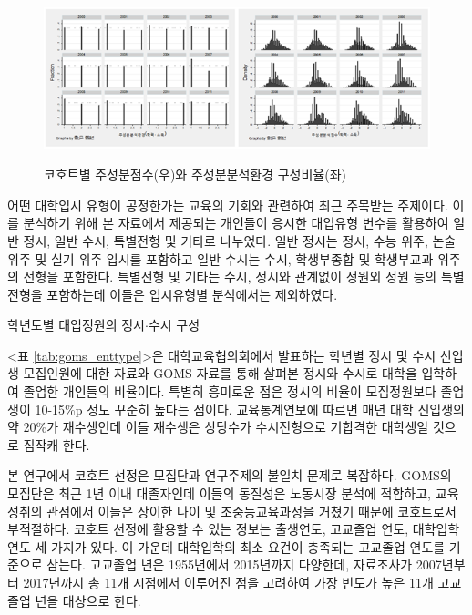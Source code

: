 \begin{figure}
    \centering
    \caption{코호트별 주성분점수(우)와 주성분분석환경 구성비율(좌)}
    \includegraphics[width=\textwidth]{figure/goms_pca.png}
    \label{fig:goms_pca}
\end{figure}

어떤 대학입시 유형이 공정한가는 교육의 기회와 관련하여 최근 주목받는 주제이다.
이를 분석하기 위해 본 자료에서 제공되는 개인들이 응시한 대입유형 변수를 활용하여 일반 정시, 일반 수시, 특별전형 및 기타로 나누었다.
 일반 정시는 정시, 수능 위주, 논술 위주 및 실기 위주 입시를 포함하고 일반 수시는 수시, 학생부종합 및 학생부교과 위주의 전형을 포함한다.
 특별전형 및 기타는 수시, 정시와 관계없이 정원외 정원 등의 특별전형을 포함하는데 이들은 입시유형별 분석에서는 제외하였다.

\begin{table}[htbp]
    \centering
    \caption{학년도별 대입정원의 정시$\cdot$수시 구성}
    
    \label{tab:goms_enttype}
\end{table}

<표 \ref{tab:goms_enttype}>은 대학교육협의회에서 발표하는 학년별 정시 및 수시 신입생 모집인원에 대한 자료와 GOMS 자료를 통해 살펴본 정시와 수시로 대학을 입학하여 졸업한 개인들의 비율이다.
특별히 흥미로운 점은 정시의 비율이 모집정원보다 졸업생이 10-15\%p 정도 꾸준히 높다는 점이다.
교육통계연보에 따르면 매년 대학 신입생의 약 20\%가 재수생인데 이들 재수생은 상당수가 수시전형으로 기합격한 대학생일 것으로 짐작캐 한다.

본 연구에서 코호트 선정은 모집단과 연구주제의 불일치 문제로 복잡하다.
GOMS의 모집단은 최근 1년 이내 대졸자인데 이들의 동질성은 노동시장 분석에 적합하고, 교육성취의 관점에서 이들은 상이한 나이 및 초중등교육과정을 거쳤기 때문에 코호트로서 부적절하다.
 코호트 선정에 활용할 수 있는 정보는 출생연도, 고교졸업 연도, 대학입학 연도 세 가지가 있다.
 이 가운데 대학입학의 최소 요건이 충족되는 고교졸업 연도를 기준으로 삼는다.
 고교졸업 년은 1955년에서 2015년까지 다양한데, 자료조사가 2007년부터 2017년까지 총 11개 시점에서 이루어진 점을 고려하여 가장 빈도가 높은 11개 고교졸업 년을 대상으로 한다.
 
